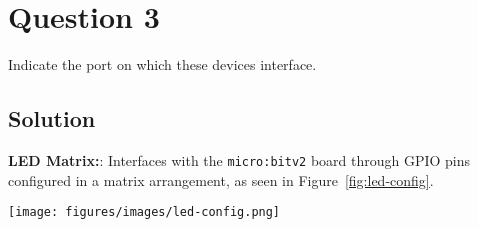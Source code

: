 \section*{Question 3}

Indicate the port on which these devices interface.

\subsection*{Solution}

\textbf{LED Matrix:}: Interfaces with the \texttt{micro:bit\;v2} board through GPIO pins configured in a matrix arrangement, as seen in Figure~\ref{fig:led-config}.

\begin{table}[htbp]
    \centering
    
    \caption{
        Port configuration of the LED matrix
    }\label{tab:led-matrix}
\end{table}

\begin{figure*}[htbp]
    \centering
    \texttt{[image: figures/images/led-config.png]}
    \caption{
        LED matrix configuration.\\
        The corresponding port config for each row and column is given in Table~\ref{tab:led-matrix}.
    }\label{fig:led-config}
\end{figure*}
